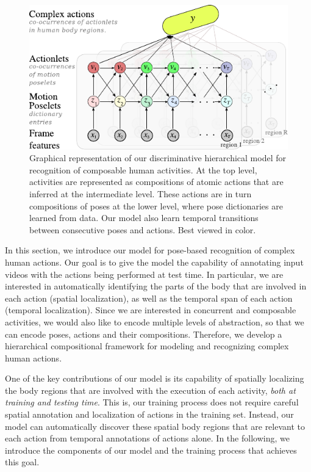 \begin{figure}[tb]
\begin{center}
\includegraphics[width=0.99\linewidth]{./Fig/modelo.pdf}
\end{center}
   \caption{Graphical representation of our discriminative hierarchical model for recognition of composable human activities.
At the top level, activities are represented as compositions of atomic actions that are inferred at
the intermediate level. These actions are in turn compositions of poses at the
lower level, where pose dictionaries are learned from data. Our model also learn
temporal transitions between consecutive poses and actions. Best viewed in
color.}
\label{fig:overview}

\end{figure}


In this section, we introduce our model for pose-based recognition of complex
human actions. Our goal is to give the model the capability of annotating input
videos with the actions being performed at test time. In particular, we are
interested in automatically identifying the parts of the body that are involved
in each action (spatial localization), as well as the temporal span of each
action (temporal localization). Since we are interested in concurrent and
composable activities, we would also like to encode multiple levels of
abstraction, so that we can encode poses, actions and their compositions.
Therefore, we develop a hierarchical compositional framework for modeling and
recognizing complex human actions.

One of the key contributions of our model is its capability of spatially
localizing the body regions that are involved with the execution of each
activity, \emph{both at training and testing time}. This is, our training
process does not require careful spatial annotation and localization of
actions in the training set. Instead, our model can automatically
discover these spatial body regions that are relevant to each action
from temporal annotations of actions alone. In the following, we introduce
the components of our model and the training process that achieves this goal.

